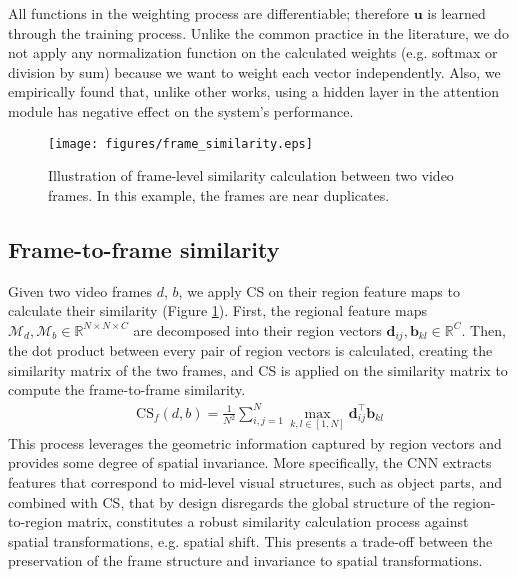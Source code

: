 \documentclass[10pt,twocolumn,letterpaper]{article}
\begin{document}
All functions in the weighting process are differentiable; therefore $\textbf{u}$ is learned through the training process. Unlike the common practice in the literature, we do not apply any normalization function on the calculated weights (e.g. softmax or division by sum) because we want to weight each vector independently. Also, we empirically found that, unlike other works, using a hidden layer in the attention module has negative effect on the system's performance.

\begin{figure}[t]
\centering
\texttt{[image: figures/frame\_similarity.eps]}
\caption{Illustration of frame-level similarity calculation between two video frames. In this example, the frames are near duplicates.}
\label{fig:frame_level_similarity}
\end{figure}

\subsection{Frame-to-frame similarity}
\label{sec:frame_level_similarity}

Given two video frames $d$, $b$, we apply CS on their region feature maps to calculate their similarity (Figure \ref{fig:frame_level_similarity}). First, the regional feature maps $\mathcal{M}_d, \mathcal{M}_b \in \mathbb{R}^{N \times N \times C}$ are decomposed into their region vectors $\textbf{d}_{ij},\textbf{b}_{kl} \in \mathbb{R}^{C}$. Then, the dot product between every pair of region vectors is calculated, creating the similarity matrix of the two frames, and CS is applied on the similarity matrix to compute the frame-to-frame similarity.
\begin{equation}
    \begin{aligned}
    \text{CS}_f(d, b) = \frac{1}{N^2}\sum_{i,j=1}^{N} \max_{k, l \in [1,N]} \textbf{d}_{ij}^\top\textbf{b}_{kl}
    \end{aligned}
    \label{eq:frame_level_similarity}
\end{equation}
This process leverages the geometric information captured by region vectors and provides some degree of spatial invariance. More specifically, the CNN extracts features that correspond to mid-level visual structures, such as object parts, and combined with CS, that by design disregards the global structure of the region-to-region matrix, constitutes a robust similarity calculation process against spatial transformations, e.g. spatial shift. This presents a trade-off between the preservation of the frame structure and invariance to spatial transformations.
\end{document}

